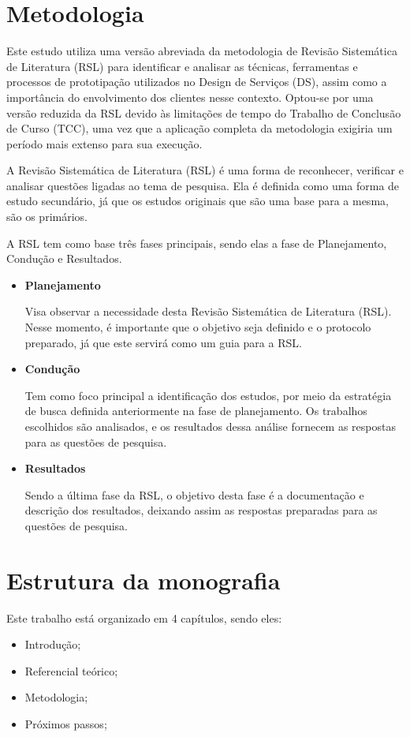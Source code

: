 \section{Metodologia}

Este estudo utiliza uma versão abreviada da metodologia de Revisão Sistemática de Literatura (RSL) para identificar e analisar as técnicas, ferramentas e processos de prototipação utilizados no Design de Serviços (DS), assim como a importância do envolvimento dos clientes nesse contexto. Optou-se por uma versão reduzida da RSL devido às limitações de tempo do Trabalho de Conclusão de Curso (TCC), uma vez que a aplicação completa da metodologia exigiria um período mais extenso para sua execução. 

A Revisão Sistemática de Literatura (RSL) é uma forma de reconhecer, verificar e analisar questões ligadas ao tema de pesquisa. Ela é definida como uma forma de estudo secundário, já que os estudos originais que são uma base para a mesma, são os primários.

A RSL tem como base três fases principais, sendo elas a fase de Planejamento, Condução e Resultados.

\begin{itemize}
	\item \textbf{Planejamento}
	
	Visa observar a necessidade desta Revisão Sistemática de Literatura (RSL). Nesse momento, é importante que o objetivo seja definido e o protocolo preparado, já que este servirá como um guia para a RSL.
	
	\item \textbf{Condução}
	
	Tem como foco principal a identificação dos estudos, por meio da estratégia de busca definida anteriormente na fase de planejamento. Os trabalhos escolhidos são analisados, e os resultados dessa análise fornecem as respostas para as questões de pesquisa.
	
	\item \textbf{Resultados}
	
	Sendo a última fase da RSL, o objetivo desta fase é a documentação e descrição dos resultados, deixando assim as respostas preparadas para as questões de pesquisa.
\end{itemize}

\section{Estrutura da monografia}

Este trabalho está organizado em 4 capítulos, sendo eles:

\begin{itemize}
	\item Introdução;
	
	\item Referencial teórico;
	
	\item Metodologia;
	
	\item Próximos passos;
\end{itemize}
